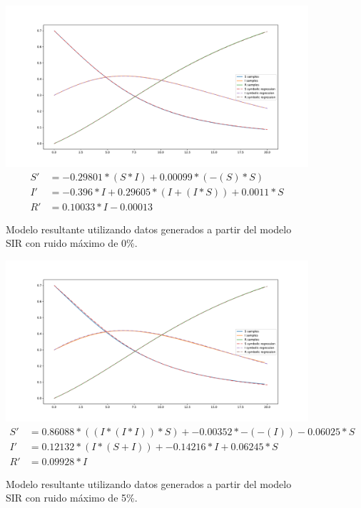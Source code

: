 \begin{figure}[h]
    \centering
    \includegraphics[width=\textwidth]{"figures/final_plot_SIR_0.0.pdf"}
    \begin{align*}
        S' & = -0.29801 * (S * I) + 0.00099 * (-(S) * S)         \\
        I' & = -0.396 * I + 0.29605 * (I + (I * S)) + 0.0011 * S \\
        R' & = 0.10033 * I -0.00013
    \end{align*}
    \caption{Modelo resultante utilizando datos generados a partir del modelo SIR con ruido máximo de 0\%.}
    \label{fig:final_plot_SIR_0.0}
\end{figure}

\begin{figure}[h]
    \centering
    \includegraphics[width=\textwidth]{"figures/final_plot_SIR_0.05.pdf"}
    \begin{align*}
        S' & = 0.86088 * ((I * (I * I)) * S) + -0.00352 * -(-(I)) -0.06025 * S \\
        I' & = 0.12132 * (I * (S + I)) + -0.14216 * I + 0.06245 * S            \\
        R' & = 0.09928 * I
    \end{align*}
    \caption{Modelo resultante utilizando datos generados a partir del modelo SIR con ruido máximo de 5\%.}
    \label{fig:final_plot_SIR_0.05}
\end{figure}

